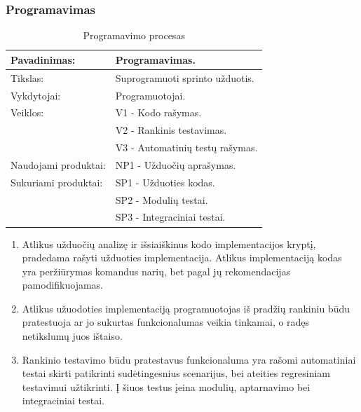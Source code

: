 \documentclass{VUMIFPSkursinis}
\begin{document}
	\subsubsection{Programavimas}
	\begin{center}
		\begin{table}[ht]
		\caption{Programavimo procesas}
		\begin{tabular}{ | l | l | } 
		\hline
		Pavadinimas:         & Programavimas.                      \\ \hline
		Tikslas: 	           & Suprogramuoti sprinto užduotis.      \\ \hline
		Vykdytojai:          & Programuotojai.                       \\ \hline
		Veiklos:             & V1 - Kodo rašymas. 									  \\
						             & V2 - Rankinis testavimas. 							 \\
					 	             & V3 - Automatinių testų rašymas. 					\\ \hline
		Naudojami produktai: & NP1 - Užduočių aprašymas.								 \\ \hline
		Sukuriami produktai: & SP1 - Užduoties kodas. 							  		\\
												 & SP2 - Modulių testai. 											 \\
												 & SP3 - Integraciniai testai. 									\\ \hline
		\end{tabular}
	\end{table}
		\end{center}
		\begin{enumerate}
			\item Atlikus užduočių analizę ir išsiaiškinus kodo implementacijos kryptį, pradedama rašyti užduoties implementacija. Atlikus implementaciją kodas yra peržiūrymas komandus narių, bet pagal jų rekomendacijas pamodifikuojamas.
			\item Atlikus užuodoties implementaciją programuotojas iš pradžių rankiniu būdu pratestuoja ar jo sukurtas funkcionalumas veikia tinkamai, o radęs netikslumų juos ištaiso.
			\item Rankinio testavimo būdu pratestavus funkcionaluma yra rašomi automatiniai testai skirti patikrinti sudėtingesnius scenarijus, bei ateities regresiniam testavimui užtikrinti. Į šiuos testus įeina modulių, aptarnavimo bei integraciniai testai.
		\end{enumerate}
\end{document}
